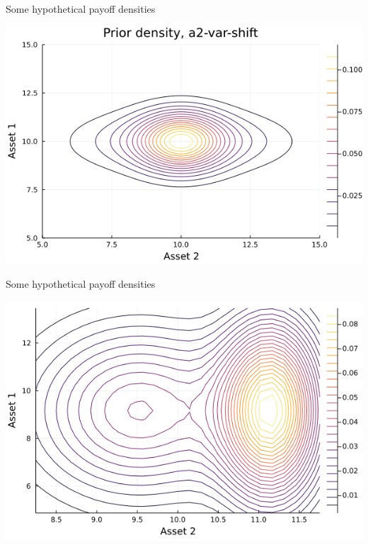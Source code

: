 \documentclass[
  ignorenonframetext,
]{beamer}
\begin{document}
\begin{frame}{Some hypothetical payoff densities}
\protect\hypertarget{some-hypothetical-payoff-densities}{}
\begin{center}\includegraphics[width=0.8\paperheight]{complexity_files/figure-beamer/unnamed-chunk-6-1} \end{center}
\end{frame}

\begin{frame}{Some hypothetical payoff densities}
\protect\hypertarget{some-hypothetical-payoff-densities-1}{}
\begin{center}\includegraphics[width=0.8\paperheight]{complexity_files/figure-beamer/unnamed-chunk-7-1} \end{center}
\end{frame}
\end{document}
